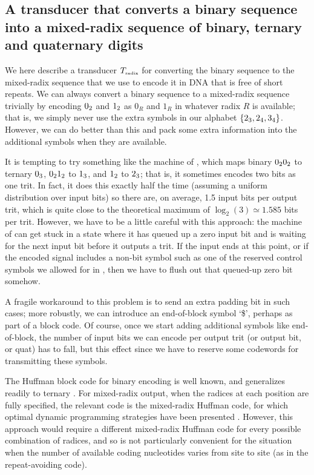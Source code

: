 \documentclass[english]{article}
\begin{document}
\subsection{A transducer that converts a binary sequence into a mixed-radix sequence of binary, ternary and quaternary digits}

We here describe a transducer $T_{\mbox{\tiny radix}}$ for converting the binary sequence to the mixed-radix sequence
that we use to encode it in DNA that is free of short repeats.
We can always convert a binary sequence to a mixed-radix sequence trivially by encoding
$0_2$ and $1_2$ as $0_R$ and $1_R$ in whatever radix $R$ is available;
that is, we simply never use the extra symbols in our alphabet $\{ 2_3, 2_4, 3_4 \}$.
However, we can do better than this and pack some extra information into the additional symbols when they are available.

It is tempting to try something like the machine of ,
which maps binary $0_20_2$ to ternary $0_3$,
$0_21_2$ to $1_3$,
and $1_2$ to $2_3$;
that is, it sometimes encodes two bits as one trit.
In fact, it does this exactly half the time (assuming a uniform distribution over input bits)
so there are, on average, 1.5 input bits per output trit,
which is quite close to the theoretical maximum of $\log_2(3) \simeq 1.585$ bits per trit.
However, we have to be a little careful with this approach:
the machine of  can get stuck in a state where it has queued up a zero input bit
and is waiting for the next input bit before it outputs a trit.
If the input ends at this point, or if the encoded signal includes a non-bit symbol
such as one of the reserved control symbols we allowed for in ,
then we have to flush out that queued-up zero bit somehow.

A fragile workaround to this problem is to send an extra padding bit in such cases;
more robustly, we can introduce an end-of-block symbol `\$',
perhaps as part of a block code.
Of course, once we start adding additional symbols like end-of-block, the number of input bits we can encode per output trit (or output bit, or quat) has to fall,
but this effect 
since we have to reserve some codewords for transmitting these symbols.

The Huffman block code for binary encoding is well known, and generalizes readily to ternary \cite{BornholtEtAl2016}.
For mixed-radix output, when the radices at each position are fully specified,
the relevant code is the mixed-radix Huffman code, for which optimal dynamic programming strategies have been presented \cite{ChuGill1992,GolinEtAl2009}.
However, this approach would require a different mixed-radix Huffman code for every possible combination of radices,
and so is not particularly convenient for the situation when the number of available coding nucleotides varies from site to site
(as in the repeat-avoiding code).
\end{document}
